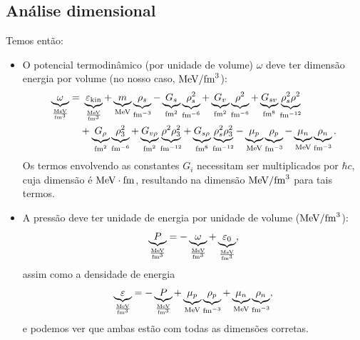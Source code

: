 \subsection{Análise dimensional}

Temos então:
\begin{fullwidth}
\begin{itemize}

\item O potencial termodinâmico (por unidade de volume) $\omega$ deve ter dimensão energia por volume (no nosso caso, $\rm{MeV}/\rm{fm}^3$):
\begin{equation}
\begin{split}
	\underbrace{\omega}_{\frac{\rm{MeV}}{\rm{fm}^3}} =&~ \underbrace{\varepsilon_{\rm{kin}}}_{\frac{\rm{MeV}}{\rm{fm}^3}} +\underbrace{m}_{\rm{MeV}}\underbrace{\rho_s}_{\rm{fm}^{-3}} - \underbrace{G_s}_{\rm{fm}^2}\underbrace{\rho_s^2}_{\rm{fm}^{-6}} + \underbrace{G_v}_{\rm{fm}^2}\underbrace{\rho^2}_{\rm{fm}^{-6}} + \underbrace{G_{sv}}_{\rm{fm}^8}\underbrace{\rho_s^2\rho^2}_{\rm{fm}^{-12}} \\
&+ \underbrace{G_\rho}_{\rm{fm}^2}\underbrace{\rho_3^2}_{\rm{fm}^{-6}} + \underbrace{G_{v\rho}}_{\rm{fm}^2}\underbrace{\rho^2\rho_3^2}_{\rm{fm}^{-12}} + \underbrace{G_{s\rho}}_{\rm{fm}^8}\underbrace{\rho_s^2\rho_3^2}_{\rm{fm}^{-12}} - \underbrace{\mu_p}_{\rm{MeV}}\underbrace{\rho_p}_{\rm{fm}^{-3}} - \underbrace{\mu_n}_{\rm{MeV}}\underbrace{\rho_n}_{\rm{fm}^{-3}}.
\end{split}
\end{equation}
%
Os termos envolvendo as constantes $G_i$ necessitam ser multiplicados por $\hbar c$, cuja dimensão é $\rm{MeV}\cdot\rm{fm}$, resultando na dimensão $\rm{MeV}/\rm{fm}^3$ para tais termos.

\item A pressão deve ter unidade de energia por unidade de volume ($\rm{MeV}/\rm{fm}^3$):
\begin{equation}
	\underbrace{P}_{\frac{\rm{MeV}}{\rm{fm}^3}} = - \underbrace{\omega}_{\frac{\rm{MeV}}{\rm{fm}^3}} + \underbrace{\varepsilon_0}_{\frac{\rm{MeV}}{\rm{fm}^3}},
\end{equation}
%
assim como a densidade de energia
\begin{equation}
	\underbrace{\varepsilon}_{\frac{\rm{MeV}}{\rm{fm}^3}} = - \underbrace{P}_{\frac{\rm{MeV}}{\rm{fm}^3}} + \underbrace{\mu_p}_{\rm{MeV}}\underbrace{\rho_p}_{\rm{fm}^{-3}} + \underbrace{\mu_n}_{\rm{MeV}}\underbrace{\rho_n}_{\rm{fm}^{-3}},
\end{equation}
%
e podemos ver que ambas estão com todas as dimensões corretas.


\end{itemize}
\end{fullwidth}

